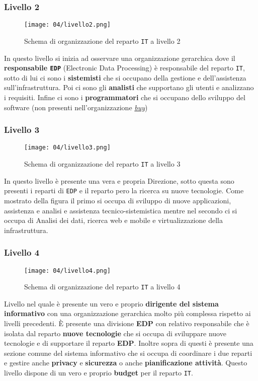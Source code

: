         \subsubsection{Livello 2}
            \begin{figure}[H]
                \centering 
                \texttt{[image: 04/livello2.png]}
                \caption{Schema di organizzazione del reparto \texttt{IT} a livello 2}
            \end{figure}
            In questo livello si inizia ad osservare una organizzazione gerarchica dove il \textbf{responsabile \texttt{EDP}} (Electronic Data Processing) è responsabile del reparto \texttt{IT}, sotto di lui ci sono i \textbf{sistemisti} che si occupano della gestione e dell'assistenza sull'infrastruttura. Poi ci sono gli \textbf{analisti} che supportano gli utenti e analizzano i requisiti. Infine ci sono i \textbf{programmatori} che si occupano dello sviluppo del software (non presenti nell'organizzazione \hyperref[sec:opzBuy]{\textit{buy}})
        \subsubsection{Livello 3}
            \begin{figure}[H]
                \centering 
                \texttt{[image: 04/livello3.png]}
                \caption{Schema di organizzazione del reparto \texttt{IT} a livello 3}
            \end{figure}
            In questo livello è presente una vera e propria Direzione, sotto questa sono presenti i reparti di \texttt{EDP} e il reparto pero la ricerca su nuove tecnologie. Come mostrato della figura il primo si occupa di sviluppo di nuove applicazioni, assistenza e analisi e assistenza tecnico-sistemistica mentre nel secondo ci si occupa di Analisi dei dati, ricerca web e mobile e virtualizzazione della infrastruttura.
        \subsubsection{Livello 4}
            \begin{figure}[H]
                \centering 
                \texttt{[image: 04/livello4.png]}
                \caption{Schema di organizzazione del reparto \texttt{IT} a livello 4}
            \end{figure}
            Livello nel quale è presente un vero e proprio \textbf{dirigente del sistema informativo} con una organizzazione gerarchica molto più complessa rispetto ai livelli precedenti. È presente una divisione \textbf{EDP} con relativo responsabile che è isolata dal reparto \textbf{nuove tecnologie} che si occupa di sviluppare nuove tecnologie e di supportare il reparto \textbf{EDP}. Inoltre sopra di questi è presente una sezione comune del sistema informativo che si occupa di coordinare i due reparti e gestire anche \textbf{privacy} e \textbf{sicurezza} o anche \textbf{pianificazione attività}. Questo livello dispone di un vero e proprio \textbf{budget} per il reparto \texttt{IT}.
